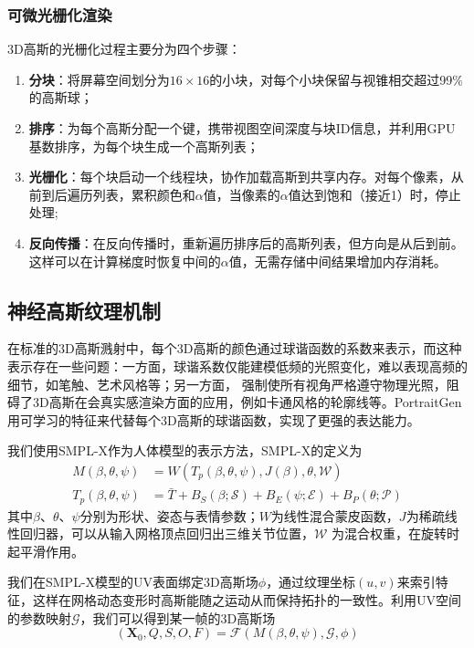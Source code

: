 \subsubsection{可微光栅化渲染}

3D高斯的光栅化过程主要分为四个步骤：
\begin{enumerate}
    \item \textbf{分块}：将屏幕空间划分为$16\times 16$的小块，对每个小块保留与视锥相交超过99\%的高斯球；
    \item \textbf{排序}：为每个高斯分配一个键，携带视图空间深度与块ID信息，并利用GPU基数排序，为每个块生成一个高斯列表；
    \item \textbf{光栅化}：每个块启动一个线程块，协作加载高斯到共享内存。对每个像素，从前到后遍历列表，累积颜色和$\alpha$值，当像素的$\alpha$值达到饱和（接近1）时，停止处理;
    \item \textbf{反向传播}：在反向传播时，重新遍历排序后的高斯列表，但方向是从后到前。这样可以在计算梯度时恢复中间的$\alpha$值，无需存储中间结果增加内存消耗。
\end{enumerate}

\subsection{神经高斯纹理机制}

在标准的3D高斯溅射中，每个3D高斯的颜色通过球谐函数的系数来表示，而这种表示存在一些问题：一方面，球谐系数仅能建模低频的光照变化，难以表现高频的细节，如笔触、艺术风格等；另一方面，
强制使所有视角严格遵守物理光照，阻碍了3D高斯在会真实感渲染方面的应用，例如卡通风格的轮廓线等。PortraitGen用可学习的特征来代替每个3D高斯的球谐函数，实现了更强的表达能力。

我们使用SMPL-X作为人体模型的表示方法，SMPL-X的定义为
\begin{align}
    M(\beta,\theta,\psi)&=W(T_p(\beta,\theta,\psi), J(\beta),\theta, \mathcal{W})\\
    T_p(\beta,\theta,\psi)&=\bar{T}+B_S(\beta;\mathcal{S})+B_E(\psi;\mathcal{E})+B_P(\theta;\mathcal{P})
\end{align}
其中$\beta$、$\theta$、$\psi$分别为形状、姿态与表情参数；$W$为线性混合蒙皮函数，$J$为稀疏线性回归器，可以从输入网格顶点回归出三维关节位置，$\mathcal{W}$
为混合权重，在旋转时起平滑作用。

我们在SMPL-X模型的UV表面绑定3D高斯场$\phi$，通过纹理坐标$(u,v)$来索引特征，这样在网格动态变形时高斯能随之运动从而保持拓扑的一致性。利用UV空间的参数映射$\mathcal{G}$，我们可以得到某一帧的3D高斯场
\begin{equation}
    (\symbf{X}_0,Q,S,O,F)=\mathcal{F}(M(\beta,\theta,\psi),\mathcal{G},\phi)
\end{equation}

